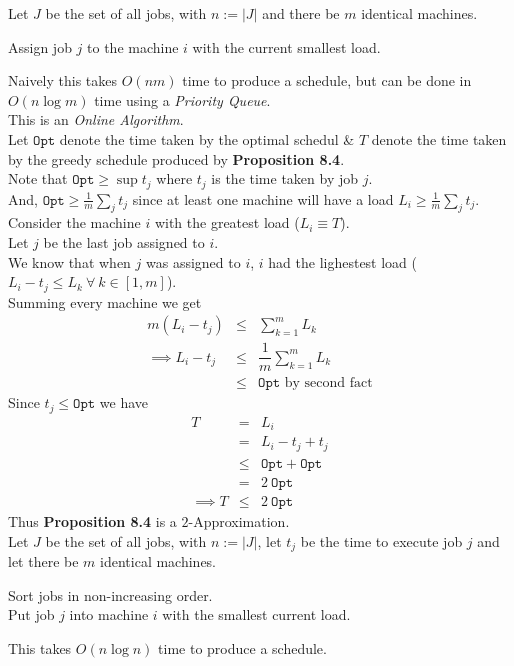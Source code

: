\documentclass[11pt,a4paper]{article}
\begin{document}
Let $J$ be the set of all jobs, with $n:=|J|$ and there be $m$ identical machines.
\begin{center}
Assign job $j$ to the machine $i$ with the current smallest load.
\end{center}
Naively this takes $O(nm)$ time to produce a schedule, but can be done in $O(n\log m)$ time using a \textit{Priority Queue}.\\
\nb This is an \textit{Online Algorithm}.\\

Let $\mathtt{Opt}$ denote the time taken by the optimal schedul \& $T$ denote the time taken by the greedy schedule produced by \textbf{Proposition 8.4}.\\
Note that $\mathtt{Opt}\geq\sup t_j$ where $t_j$ is the time taken by job $j$.\\
And, $\mathtt{Opt}\geq\frac1m\sum_jt_j$ since at least one machine will have a load $L_i\geq\frac1m\sum_jt_j$.\\
Consider the machine $i$ with the greatest load (\ie $L_i\equiv T$).\\
Let $j$ be the last job assigned to $i$.\\
We know that when $j$ was assigned to $i$, $i$ had the lighestest load (\ie $L_i-t_j\leq L_k\ \forall\ k\in[1,m]$).\\
Summing every machine we get
\[\begin{array}{rcl}
m(L_i-t_j)&\leq&\displaystyle\sum_{k=1}^mL_k\\
\implies L_i-t_j&\leq&\dfrac1m\displaystyle\sum_{k=1}^mL_k\\
&\leq&\mathtt{Opt}\text{ by second fact}
\end{array}\]
Since $t_j\leq\mathtt{Opt}$ we have
\[\begin{array}{rcl}
T&=&L_i\\
&=&L_i-t_j+t_j\\
&\leq&\mathtt{Opt}+\mathtt{Opt}\\
&=&2\ \mathtt{Opt}\\
\implies T&\leq&2\ \mathtt{Opt}
\end{array}\]
Thus \textbf{Proposition 8.4} is a $2$-Approximation.\\

Let $J$ be the set of all jobs, with $n:=|J|$, let $t_j$ be the time to execute job $j$ and let there be $m$ identical machines.
\begin{center}
Sort jobs in non-increasing order.\\
Put job $j$ into machine $i$ with the smallest current load.
\end{center}
This takes $O(n\log n)$ time to produce a schedule.\\
\end{document}
